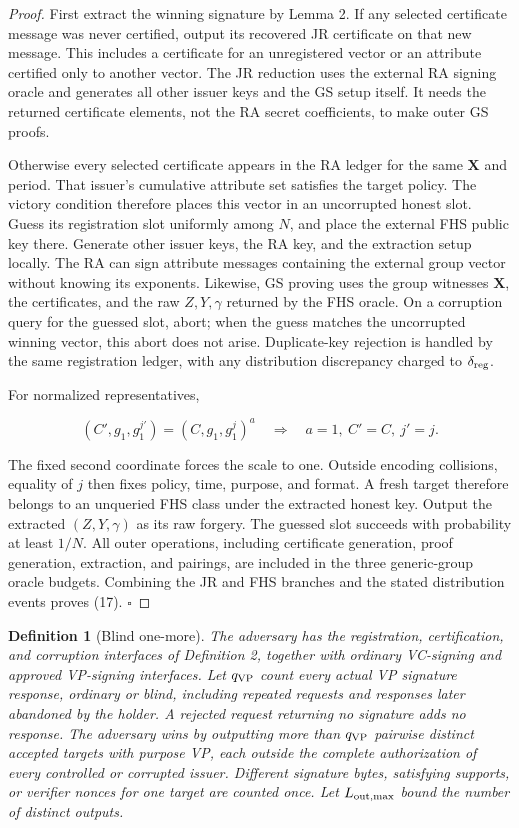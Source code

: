 \documentclass[11pt]{article}
\newtheorem{definition}{Definition}
\begin{document}
\begin{proof}
First extract the winning signature by Lemma 2. If any selected certificate message was never certified, output its recovered JR certificate on that new message. This includes a certificate for an unregistered vector or an attribute certified only to another vector. The JR reduction uses the external RA signing oracle and generates all other issuer keys and the GS setup itself. It needs the returned certificate elements, not the RA secret coefficients, to make outer GS proofs.

Otherwise every selected certificate appears in the RA ledger for the same \(\boldsymbol X\) and period. That issuer's cumulative attribute set satisfies the target policy. The victory condition therefore places this vector in an uncorrupted honest slot. Guess its registration slot uniformly among \(N\), and place the external FHS public key there. Generate other issuer keys, the RA key, and the extraction setup locally. The RA can sign attribute messages containing the external group vector without knowing its exponents. Likewise, GS proving uses the group witnesses \(\boldsymbol X\), the certificates, and the raw \(Z,Y,\gamma\) returned by the FHS oracle. On a corruption query for the guessed slot, abort; when the guess matches the uncorrupted winning vector, this abort does not arise. Duplicate-key rejection is handled by the same registration ledger, with any distribution discrepancy charged to \(\delta_{\rm reg}\).

For normalized representatives,

\[
(C',g_1,g_1^{j'})=(C,g_1,g_1^j)^a
\quad\Longrightarrow\quad a=1,\ C'=C,\ j'=j.
\tag{18}
\]

The fixed second coordinate forces the scale to one. Outside encoding collisions, equality of \(j\) then fixes policy, time, purpose, and format. A fresh target therefore belongs to an unqueried FHS class under the extracted honest key. Output the extracted \((Z,Y,\gamma)\) as its raw forgery. The guessed slot succeeds with probability at least \(1/N\). All outer operations, including certificate generation, proof generation, extraction, and pairings, are included in the three generic-group oracle budgets. Combining the JR and FHS branches and the stated distribution events proves (17). \(\square\)

\end{proof}
\begin{definition}[Blind one-more]
The adversary has the registration, certification, and corruption interfaces of Definition 2, together with ordinary VC-signing and approved VP-signing interfaces. Let \(q_{\rm VP}\) count every actual VP signature response, ordinary or blind, including repeated requests and responses later abandoned by the holder. A rejected request returning no signature adds no response. The adversary wins by outputting more than \(q_{\rm VP}\) pairwise distinct accepted targets with purpose VP, each outside the complete authorization of every controlled or corrupted issuer. Different signature bytes, satisfying supports, or verifier nonces for one target are counted once. Let \(L_{\rm out,max}\) bound the number of distinct outputs.

\end{definition}
\end{document}
